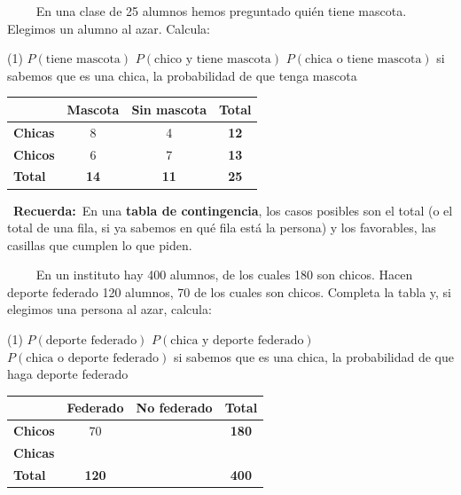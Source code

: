 \documentclass[11pt,a4paper]{article}
\newcommand{\estrelles}[1]{{\color{accent}\ifcase#1\or\faStar\faStar[regular]\faStar[regular]\or\faStar\faStar\faStar[regular]\or\faStar\faStar\faStar\fi}}
\newcounter{exer}
\newcommand{\ex}[1]{\par\needspace{4\baselineskip}\medskip\stepcounter{exer}\noindent{\color{navy}\bfseries\theexer.}\ \ {\small\estrelles{#1}}\ \ }
\newcommand{\recorda}[1]{\par\smallskip\begin{tcolorbox}[colback=accent!7,colframe=accent!55,arc=2mm,boxrule=0.5pt,left=2.5mm,right=2.5mm,top=1mm,bottom=1mm]\small{\color{accent}\faLightbulb[regular]}\ \textbf{Recuerda:}\ #1\end{tcolorbox}}
\begin{document}
\ex{1} En una clase de 25 alumnos hemos preguntado quién tiene mascota. Elegimos un alumno al azar. Calcula:
\begin{tasks}(1)
  \task $P(\text{tiene mascota})$
  \task $P(\text{chico y tiene mascota})$
  \task $P(\text{chica o tiene mascota})$
  \task si sabemos que es una chica, la probabilidad de que tenga mascota
\end{tasks}
\par\smallskip\begin{center}{\small\renewcommand{\arraystretch}{1.3}\begin{tabular}{l|cc|c}
\rowcolor{soft} & Mascota & Sin mascota & Total\\\hline
\cellcolor{soft}\textbf{Chicas} & 8 & 4 & \textbf{12}\\
\cellcolor{soft}\textbf{Chicos} & 6 & 7 & \textbf{13}\\\hline
\cellcolor{soft}\textbf{Total} & \textbf{14} & \textbf{11} & \textbf{25}\\
\end{tabular}}\end{center}\recorda{En una \textbf{tabla de contingencia}, los casos posibles son el total (o el total de una fila, si ya sabemos en qué fila está la persona) y los favorables, las casillas que cumplen lo que piden.}

\ex{2} En un instituto hay 400 alumnos, de los cuales 180 son chicos. Hacen deporte federado 120 alumnos, 70 de los cuales son chicos. Completa la tabla y, si elegimos una persona al azar, calcula:
\begin{tasks}(1)
  \task $P(\text{deporte federado})$
  \task $P(\text{chica y deporte federado})$
  \task $P(\text{chica o deporte federado})$
  \task si sabemos que es una chica, la probabilidad de que haga deporte federado
\end{tasks}
\par\smallskip\begin{center}{\small\renewcommand{\arraystretch}{1.3}\begin{tabular}{l|cc|c}
\rowcolor{soft} & Federado & No federado & Total\\\hline
\cellcolor{soft}\textbf{Chicos} & 70 & \phantom{000} & \textbf{180}\\
\cellcolor{soft}\textbf{Chicas} & \phantom{000} & \phantom{000} & \phantom{000}\\\hline
\cellcolor{soft}\textbf{Total} & \textbf{120} & \phantom{000} & \textbf{400}\\
\end{tabular}}\end{center}
\end{document}
